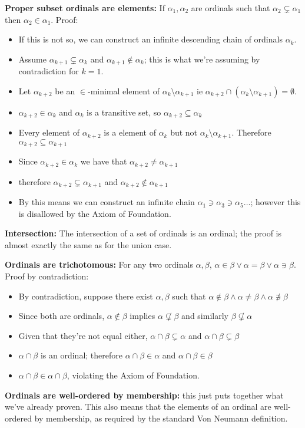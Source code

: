 \documentclass{article}
\begin{document}
\textbf{Proper subset ordinals are elements:} If $\alpha_1, \alpha_2$ are ordinals such that $\alpha_2 \subsetneq \alpha_1$ then $\alpha_2 \in \alpha_1$. Proof:
\begin{itemize}
\item If this is not so, we can construct an infinite descending chain of ordinals $\alpha_k$.
\item Assume $\alpha_{k+1} \subsetneq \alpha_k$ and $\alpha_{k+1} \not\in \alpha_k$; this is what we're assuming by contradiction for $k=1$.
\item Let $\alpha_{k+2}$ be an $\in$-minimal element of $\alpha_k \setminus \alpha_{k+1}$ ie $\alpha_{k+2} \cap (\alpha_k \setminus \alpha_{k+1}) = \emptyset$.
\item $\alpha_{k+2} \in \alpha_k$ and $\alpha_k$ is a transitive set, so $\alpha_{k+2} \subseteq \alpha_k$
\item Every element of $\alpha_{k+2}$ is a element of $\alpha_k$ but not $\alpha_k \setminus \alpha_{k+1}$. Therefore $\alpha_{k+2} \subseteq \alpha_{k+1}$
\item Since $\alpha_{k+2} \in \alpha_k$ we have that $\alpha_{k+2} \neq \alpha_{k+1}$
\item therefore $\alpha_{k+2} \subsetneq \alpha_{k+1}$ and $\alpha_{k+2} \not\in \alpha_{k+1}$
\item By this means we can construct an infinite chain $\alpha_1 \ni \alpha_3 \ni \alpha_5 \ldots$; however this is disallowed by the Axiom of Foundation.
\end{itemize}

\textbf{Intersection:} The intersection of a set of ordinals is an ordinal; the proof is almost exactly the same as for the union case.

\textbf{Ordinals are trichotomous:} For any two ordinals $\alpha, \beta$, $\alpha \in \beta \vee \alpha = \beta \vee \alpha \ni \beta$. Proof by contradiction:
\begin{itemize}
\item By contradiction, suppose there exist  $\alpha, \beta$ such that $\alpha \not\in \beta \wedge \alpha \neq \beta \wedge \alpha \not\ni \beta$
\item Since both are ordinals, $\alpha \not\in \beta$ implies $\alpha \not\subsetneq \beta$ and similarly $\beta \not\subsetneq \alpha$
\item Given that they're not equal either, $\alpha \cap \beta \subsetneq \alpha$ and $\alpha \cap \beta \subsetneq \beta$
\item $\alpha \cap \beta$ is an ordinal; therefore $\alpha \cap \beta \in \alpha$ and $\alpha \cap \beta \in \beta$
\item $\alpha \cap \beta \in \alpha \cap \beta$, violating the Axiom of Foundation.
\end{itemize}

\textbf{Ordinals are well-ordered by membership:} this just puts together what we've already proven. This also means that the elements of an ordinal are well-ordered by membership, as required by the standard Von Neumann definition.
\end{document}
